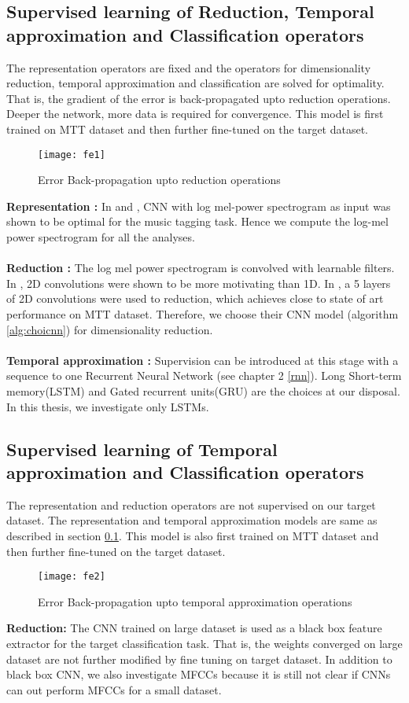 \subsection{Supervised learning of Reduction, Temporal approximation and Classification operators}
\label{fe1}
The representation operators are fixed and the operators for dimensionality reduction, temporal approximation and classification are solved for optimality. That is, the gradient of the error is back-propagated upto reduction operations. Deeper the network, more data is required for convergence. This model is first trained on MTT dataset and then further fine-tuned on the target dataset.
\begin{figure}[h] 
\centering
\texttt{[image: fe1]}
\caption{Error Back-propagation upto reduction operations }
 \label{fig:fe1}
 \end{figure}
\FloatBarrier

\noindent \textbf{Representation :} In \cite{choi_cnn} and \cite{EndToEnd}, CNN with log mel-power spectrogram as input was shown to be optimal for the music tagging task. Hence we compute the log-mel power spectrogram for all the analyses.\\
\\  
\textbf{Reduction :} The log mel power spectrogram is convolved with learnable filters. In \cite{MusicMotive}, 2D convolutions were shown to be more motivating than 1D. In \cite{choi_cnn}, a 5 layers of 2D convolutions were used to reduction, which achieves close to state of art performance on MTT dataset. Therefore, we choose their CNN model (algorithm \ref{alg:choicnn}) for dimensionality reduction.\\
\\  
\textbf{Temporal approximation :} Supervision can be introduced at this stage with a sequence to one Recurrent Neural Network (see chapter 2 \ref{rnn}). Long Short-term memory(LSTM) and Gated recurrent units(GRU) are the choices at our disposal. In this thesis, we investigate only LSTMs. 
        
\subsection{Supervised learning of Temporal approximation and Classification operators}
\label{fe2}
The representation and reduction operators are not supervised on our target dataset. The representation and temporal approximation models are same as described in section \ref{fe1}. This model is also first trained on MTT dataset and then further fine-tuned on the target dataset. 
\begin{figure}[h] 
\centering
\texttt{[image: fe2]}
\caption{Error Back-propagation upto temporal approximation operations }
 \label{fig:fe2}
 \end{figure}
\FloatBarrier
\noindent \textbf{Reduction:} The CNN trained on large dataset is used as a black box feature extractor for the target classification task. That is, the weights converged on large dataset are not further modified by fine tuning on target dataset. In addition to black box CNN, we also investigate MFCCs because it is still not clear if CNNs can out perform MFCCs for a small dataset.


